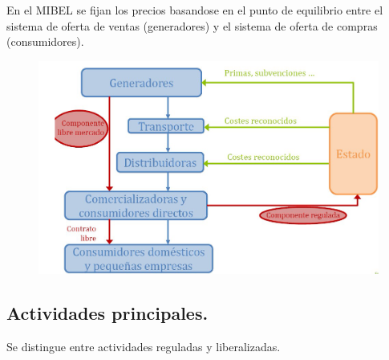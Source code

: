 En el MIBEL se fijan los precios basandose en el punto de equilibrio entre el sistema de oferta de ventas (generadores) y el sistema de oferta de compras (consumidores).
\newpage
\begin{figure}[H]
	\centering
	\includegraphics[width=0.7\linewidth]{res/tema4/diagramaPochoAdrikun}
	\label{fig:diagramapochoadrikun}
\end{figure}


\subsection{Actividades principales.}
Se distingue entre actividades reguladas y liberalizadas.


